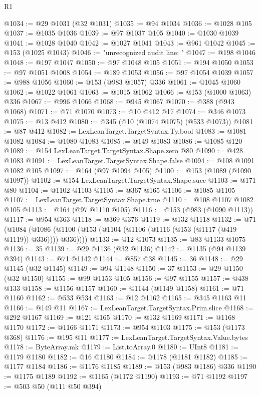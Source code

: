 \begin{lexlean}{R1}
\begin{coremodule}
{{{{{{{{{{{{{{{{{{{{{{{{{{{{{{{{{{{{{{{{{{{{{{{{{{{{{{{{{{{{{{{{{{{{{{{{{{{{{{{{{{{{{{{{{{{{{{{{{{{{{{{{{{{{{{{{{{{{{{{{{{{{{{{{{{{{{{{{{{{{{{{{{{{{{{{{{{{{{{{{{{{{{{{{{{{{{{{{{{{{{{{{{{@1034 := @29 @1031 (@32 @1031)
@1035 := @94 @1034
@1036 := @1028 @105
@1037 := @1035 @1036
@1039 := @97 @1037 @105
@1040 := @1030 @1039
@1041 := @1028 @1040
@1042 := @1027 @1041
@1043 := @961 @1042
@1045 := @153 (@1025 @1043)
@1046 := "unrecognized audit line: "
@1047 := @198 @1046
@1048 := @197 @1047
@1050 := @97 @1048 @105
@1051 := @194 @1050
@1053 := @97 @1051 @1008
@1054 := @189 @1053
@1056 := @97 @1054 @1039
@1057 := @988 @1056
@1060 := @153 (@983 @1057) @336
@1061 := @1045 @1060
@1062 := @1022 @1061
@1063 := @1015 @1062
@1066 := @153 (@1000 @1063) @336
@1067 := @996 @1066
@1068 := @945 @1067
@1070 := @388 (@943 @1068)
@1071 := @71 @1070
@1073 := @10 @412 @17
@1074 := @346 @1073
@1075 := @13 @412
@1080 := @345 (@10 (@1074 @1075) (@533 @1073))
@1081 := @87 @412
@1082 := LexLeanTarget.TargetSyntax.Ty.bool
@1083 := @1081 @1082
@1084 := @1080 @1083
@1085 := @149 @1083
@1086 := @1085 @120
@1089 := @154 LexLeanTarget.TargetSyntax.Shape.zero @80
@1090 := @428 @1083
@1091 := LexLeanTarget.TargetSyntax.Shape.false
@1094 := @108 @1091 @1082 @105
@1097 := @164 (@97 @1094 @105)
@1100 := @153 (@1089 (@1090 @1097))
@1102 := @154 LexLeanTarget.TargetSyntax.Shape.succ
@1103 := @171 @80
@1104 := @1102 @1103
@1105 := @367 @165
@1106 := @1085 @1105
@1107 := LexLeanTarget.TargetSyntax.Shape.true
@1110 := @108 @1107 @1082 @105
@1113 := @164 (@97 @1110 @105)
@1116 := @153 (@983 (@1090 @1113))
@1117 := @954 @363
@1118 := @369 @376
@1119 := @132 @1118
@1132 := @71
    (@1084 (@1086 (@1100 (@153 (@1104 (@1106 (@1116 (@153 (@1117 (@419 @1119)) @336)))) @336))))
@1133 := @12 @1073
@1135 := @83 @1133 @1075
@1136 := 35
@1139 := @29 @1136 (@32 @1136)
@1142 := @1135 (@94 @1139 @394)
@1143 := @71 @1142
@1144 := @857 @38
@1145 := 36
@1148 := @29 @1145 (@32 @1145)
@1149 := @94 @1148
@1150 := 37
@1153 := @29 @1150 (@32 @1150)
@1155 := @99 @1153 @105
@1156 := @97 @1155
@1157 := @438 @133
@1158 := @1156 @1157
@1160 := @1144 (@1149 @1158)
@1161 := @71 @1160
@1162 := @533 @534
@1163 := @12 @1162
@1165 := @345 @1163 @11
@1166 := @149 @11
@1167 := LexLeanTarget.TargetSyntax.Prim.slice
@1168 := @292 @1167
@1169 := @121 @165
@1170 := @132 @1169
@1171 := @1168 @1170
@1172 := @1166 @1171
@1173 := @954 @1103
@1175 := @153 (@1173 @368)
@1176 := @195 @11
@1177 := LexLeanTarget.TargetSyntax.Value.bytes
@1178 := ByteArray.mk
@1179 := List.toArray.{0}
@1180 := UInt8
@1181 := @1179 @1180
@1182 := @16 @1180
@1184 := @1178 (@1181 @1182)
@1185 := @1177 @1184
@1186 := @1176 @1185
@1189 := @153 (@983 @1186) @336
@1190 := @1175 @1189
@1192 := @1165 (@1172 @1190)
@1193 := @71 @1192
@1197 := @503 @50 (@111 @50 @394)
}}}}}}}}}}}}}}}}}}}}}}}}}}}}}}}}}}}}}}}}}}}}}}}}}}}}}}}}}}}}}}}}}}}}}}}}}}}}}}}}}}}}}}}}}}}}}}}}}}}}}}}}}}}}}}}}}}}}}}}}}}}}}}}}}}}}}}}}}}}}}}}}}}}}}}}}}}}}}}}}}}}}}}}}}}}}}}}}}}}}}}}}}}
\end{coremodule}
\end{lexlean}
